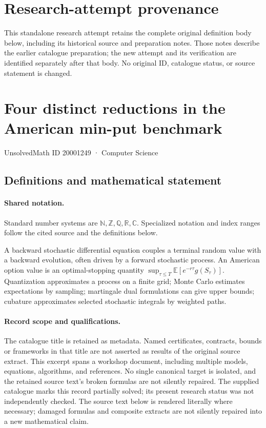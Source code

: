 \documentclass[11pt]{article}
\begin{document}
\section*{Research-attempt provenance}
This standalone research attempt retains the complete original definition body below,
including its historical source and preparation notes. Those notes describe the
earlier catalogue preparation; the new attempt and its verification are identified
separately after that body. No original ID, catalogue status, or source statement is changed.

\section{Four distinct reductions in the American min-put benchmark}\label{20001249}
{\small UnsolvedMath ID 20001249 · Computer Science}
\subsection{Definitions and mathematical statement}

\paragraph{Shared notation.}Standard number systems are $\mathbb N,\mathbb Z,\mathbb Q,\mathbb R,\mathbb C$. Specialized notation and index ranges follow the cited source and the definitions below.


A backward stochastic differential equation couples a terminal random value with a backward evolution, often driven by a forward stochastic process. An American option value is an optimal-stopping quantity $\sup_{\tau\leq T}\mathbb E[e^{-r\tau}g(S_\tau)]$. Quantization approximates a process on a finite grid; Monte Carlo estimates expectations by sampling; martingale dual formulations can give upper bounds; cubature approximates selected stochastic integrals by weighted paths.
\paragraph{Record scope and qualifications.}
The catalogue title is retained as metadata. Named certificates, contracts, bounds or frameworks in that title are not asserted as results of the original source extract.
This excerpt spans a workshop document, including multiple models, equations, algorithms, and references. No single canonical target is isolated, and the retained source text's broken formulas are not silently repaired. The supplied catalogue marks this record partially solved; its present research status was not independently checked.
The source text below is rendered literally where necessary; damaged formulas and composite extracts are not silently repaired into a new mathematical claim.
\end{document}
